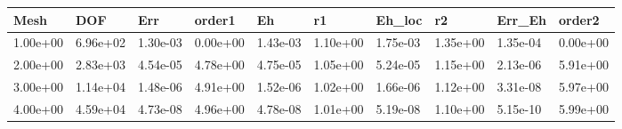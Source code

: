 \begin{tabular}{llllllllll}
Mesh & DOF & Err & order1 & Eh & r1 & Eh_loc & r2 & Err_Eh & order2 \\ 
\hline 
1.00e+00 & 6.96e+02 & 1.30e-03 & 0.00e+00 & 1.43e-03 & 1.10e+00 & 1.75e-03 & 1.35e+00 & 1.35e-04 & 0.00e+00 \\ 
2.00e+00 & 2.83e+03 & 4.54e-05 & 4.78e+00 & 4.75e-05 & 1.05e+00 & 5.24e-05 & 1.15e+00 & 2.13e-06 & 5.91e+00 \\ 
3.00e+00 & 1.14e+04 & 1.48e-06 & 4.91e+00 & 1.52e-06 & 1.02e+00 & 1.66e-06 & 1.12e+00 & 3.31e-08 & 5.97e+00 \\ 
4.00e+00 & 4.59e+04 & 4.73e-08 & 4.96e+00 & 4.78e-08 & 1.01e+00 & 5.19e-08 & 1.10e+00 & 5.15e-10 & 5.99e+00 \\ 
\hline 
\end{tabular}